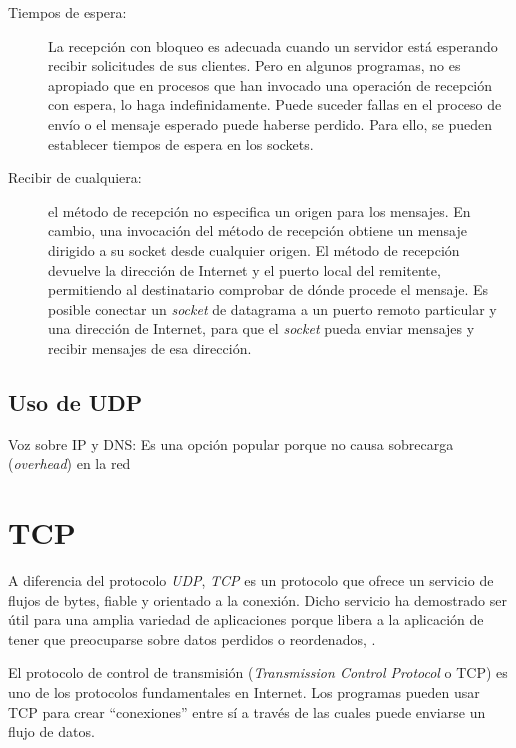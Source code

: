 \begin{description}
	\item[Tiempos de espera:]     La recepción con bloqueo   es adecuada cuando un servidor está esperando recibir solicitudes de sus clientes. Pero en algunos programas, no es apropiado que en procesos que han invocado una operación de recepción con espera, lo haga indefinidamente. Puede suceder fallas en el proceso de envío  o el mensaje esperado puede haberse	perdido. Para ello, se pueden establecer tiempos de espera en los sockets. 
	
	\item[Recibir de cualquiera:] el método de recepción no especifica un origen para los mensajes. En cambio, una invocación del m\'etodo de  recepci\'on obtiene un mensaje dirigido a su socket desde cualquier	origen. El método de recepción devuelve la dirección de Internet y el puerto local del remitente, 	permitiendo al destinatario comprobar de dónde procede el mensaje. Es posible conectar un \textit{socket} de datagrama a un puerto remoto particular y una dirección de Internet, para  que el \textit{socket} pueda enviar mensajes y recibir mensajes de esa direcci\'on. 
\end{description}
 

\subsection{Uso de UDP }  
Voz sobre IP y DNS:    Es una opción popular  porque no causa sobrecarga (\textit{overhead}) en la red
 

\section{TCP}
A diferencia del protocolo \textit{UDP}, \textit{TCP} es un protocolo que ofrece un servicio de flujos de bytes, fiable y orientado a la conexión. Dicho servicio ha demostrado ser útil para una amplia variedad de aplicaciones porque libera a la aplicación de tener que preocuparse sobre datos perdidos o reordenados, \cite{Comer2014}. 

El protocolo de control de transmisión (\textit{Transmission Control Protocol} o TCP) es uno de los protocolos fundamentales en Internet. Los programas  pueden usar TCP para crear “conexiones” entre sí a través de las cuales puede enviarse un flujo de datos.

